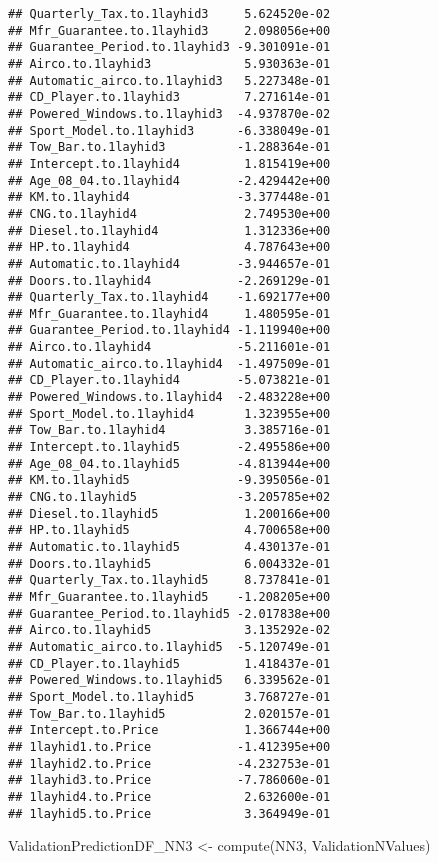\documentclass[
]{article}
\newenvironment{Shaded}{\begin{snugshade}}{\end{snugshade}}
\newcommand{\FunctionTok}[1]{\textcolor[rgb]{0.00,0.00,0.00}{#1}}
\newcommand{\NormalTok}[1]{#1}
\newcommand{\OtherTok}[1]{\textcolor[rgb]{0.56,0.35,0.01}{#1}}
\begin{document}
\begin{verbatim}
## Quarterly_Tax.to.1layhid3     5.624520e-02
## Mfr_Guarantee.to.1layhid3     2.098056e+00
## Guarantee_Period.to.1layhid3 -9.301091e-01
## Airco.to.1layhid3             5.930363e-01
## Automatic_airco.to.1layhid3   5.227348e-01
## CD_Player.to.1layhid3         7.271614e-01
## Powered_Windows.to.1layhid3  -4.937870e-02
## Sport_Model.to.1layhid3      -6.338049e-01
## Tow_Bar.to.1layhid3          -1.288364e-01
## Intercept.to.1layhid4         1.815419e+00
## Age_08_04.to.1layhid4        -2.429442e+00
## KM.to.1layhid4               -3.377448e-01
## CNG.to.1layhid4               2.749530e+00
## Diesel.to.1layhid4            1.312336e+00
## HP.to.1layhid4                4.787643e+00
## Automatic.to.1layhid4        -3.944657e-01
## Doors.to.1layhid4            -2.269129e-01
## Quarterly_Tax.to.1layhid4    -1.692177e+00
## Mfr_Guarantee.to.1layhid4     1.480595e-01
## Guarantee_Period.to.1layhid4 -1.119940e+00
## Airco.to.1layhid4            -5.211601e-01
## Automatic_airco.to.1layhid4  -1.497509e-01
## CD_Player.to.1layhid4        -5.073821e-01
## Powered_Windows.to.1layhid4  -2.483228e+00
## Sport_Model.to.1layhid4       1.323955e+00
## Tow_Bar.to.1layhid4           3.385716e-01
## Intercept.to.1layhid5        -2.495586e+00
## Age_08_04.to.1layhid5        -4.813944e+00
## KM.to.1layhid5               -9.395056e-01
## CNG.to.1layhid5              -3.205785e+02
## Diesel.to.1layhid5            1.200166e+00
## HP.to.1layhid5                4.700658e+00
## Automatic.to.1layhid5         4.430137e-01
## Doors.to.1layhid5             6.004332e-01
## Quarterly_Tax.to.1layhid5     8.737841e-01
## Mfr_Guarantee.to.1layhid5    -1.208205e+00
## Guarantee_Period.to.1layhid5 -2.017838e+00
## Airco.to.1layhid5             3.135292e-02
## Automatic_airco.to.1layhid5  -5.120749e-01
## CD_Player.to.1layhid5         1.418437e-01
## Powered_Windows.to.1layhid5   6.339562e-01
## Sport_Model.to.1layhid5       3.768727e-01
## Tow_Bar.to.1layhid5           2.020157e-01
## Intercept.to.Price            1.366744e+00
## 1layhid1.to.Price            -1.412395e+00
## 1layhid2.to.Price            -4.232753e-01
## 1layhid3.to.Price            -7.786060e-01
## 1layhid4.to.Price             2.632600e-01
## 1layhid5.to.Price             3.364949e-01
\end{verbatim}

\begin{Shaded}
\begin{Highlighting}[]
\NormalTok{ValidationPredictionDF\_NN3 }\OtherTok{\textless{}{-}} \FunctionTok{compute}\NormalTok{(NN3, ValidationNValues)}
\end{Highlighting}
\end{Shaded}
\end{document}
